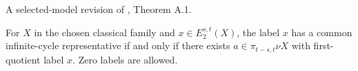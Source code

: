 \begin{theorem}
\label{frontier:Literature:e0657653596f}
A selected-model revision of \cite{BHS}, Theorem A.1.\par

For $X$ in the chosen classical family and $x\in E_2^{s,t}(X)$, the label $x$ has a common infinite-cycle representative if and only if there exists $a\in\pi_{t-s,t}\nu X$ with first-quotient label $x$. Zero labels are allowed.
\end{theorem}

